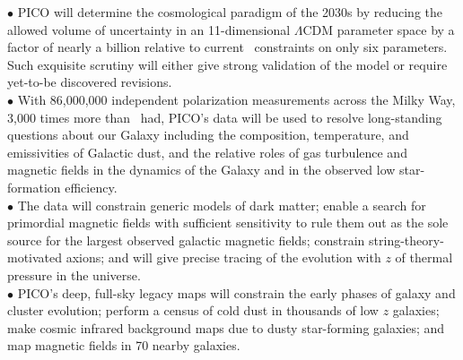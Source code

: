 \documentclass[PICOAPC.tex]{subfiles}
\begin{document}
$\bullet$ PICO will determine the cosmological paradigm of the 2030s by reducing the allowed volume of uncertainty in an 11-dimensional $ \Lambda$CDM parameter space by a factor of nearly a billion relative to current \planck\ constraints on only six parameters. Such exquisite scrutiny will either give strong validation of the model or require yet-to-be discovered revisions. \\
$\bullet$ With 86,000,000 independent polarization measurements across the Milky Way, 3,000 times more than \planck \ had, PICO's data will be used to resolve long-standing questions about our Galaxy including the 
composition, temperature, and emissivities of Galactic dust, and the relative roles of gas turbulence and magnetic fields in the dynamics of the Galaxy and in the observed low star-formation efficiency. \\
$\bullet$ The data will constrain generic models of dark matter; enable a search for primordial magnetic fields with sufficient sensitivity to rule them out as the sole source for the largest observed galactic magnetic fields; constrain string-theory-motivated axions; 
and will give precise tracing of the evolution with $z$ of thermal pressure in the universe. \\ 
$\bullet$ PICO's deep, full-sky legacy maps will constrain the early phases of galaxy and cluster evolution;  
perform a census of cold dust in thousands of low $z$ galaxies; make cosmic infrared background maps 
due to dusty star-forming galaxies; and map magnetic fields in 70 nearby galaxies. 
\end{document}
